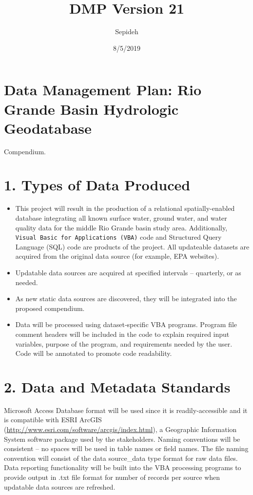 \documentclass[]{article}
\title{DMP Version 21}
\author{Sepideh}
\date{8/5/2019}
\providecommand{\tightlist}{%
  \setlength{\itemsep}{0pt}\setlength{\parskip}{0pt}}
\begin{document}
\maketitle

{
\setcounter{tocdepth}{2}
\tableofcontents
}
\section{Data Management Plan: Rio Grande Basin Hydrologic
Geodatabase}\label{data-management-plan-rio-grande-basin-hydrologic-geodatabase}

Compendium.

\section{1. Types of Data Produced}\label{types-of-data-produced}

\begin{itemize}
\tightlist
\item
  This project will result in the production of a relational
  spatially-enabled database integrating all known surface water, ground
  water, and water quality data for the middle Rio Grande basin study
  area. Additionally, \texttt{Visual\ Basic\ for\ Applications\ (VBA)}
  code and Structured Query Language (SQL) code are products of the
  project. All updateable datasets are acquired from the original data
  source (for example, EPA websites).
\item
  Updatable data sources are acquired at specified intervals --
  quarterly, or as needed.
\item
  As new static data sources are discovered, they will be integrated
  into the proposed compendium.
\item
  Data will be processed using dataset‐specific VBA programs. Program
  file comment headers will be included in the code to explain required
  input variables, purpose of the program, and requirements needed by
  the user. Code will be annotated to promote code readability.
\end{itemize}

\section{2. Data and Metadata
Standards}\label{data-and-metadata-standards}

Microsoft Access Database format will be used since it is
readily-accessible and it is compatible with ESRI ArcGIS
(\url{http://www.esri.com/software/arcgis/index.html}), a Geographic
Information System software package used by the stakeholders. Naming
conventions will be consistent -- no spaces will be used in table names
or field names. The file naming convention will consist of the data
source\_data type format for raw data files. Data reporting
functionality will be built into the VBA processing programs to provide
output in .txt file format for number of records per source when
updatable data sources are refreshed.
\end{document}

